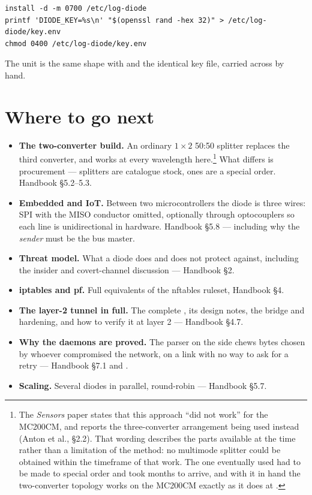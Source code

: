 \documentclass[11pt,a4paper]{article}
\begin{document}
\begin{lstlisting}[style=shell]
install -d -m 0700 /etc/log-diode
printf 'DIODE_KEY=%s\n' "$(openssl rand -hex 32)" > /etc/log-diode/key.env
chmod 0400 /etc/log-diode/key.env
\end{lstlisting}

The \dstside{} unit is the same shape with
and the identical key file, carried across by hand.

\section{Where to go next}

\begin{itemize}
\item \textbf{The two-converter build.} An ordinary $1\times2$ 50:50 splitter
      replaces the third converter, and works at every wavelength
      here.\footnote{The \emph{Sensors} paper states that this approach ``did
      not work'' for the MC200CM, and reports the three-converter arrangement
      being used instead (Anton et al., \S2.2). That wording describes the
      parts available at the time rather than a limitation of the method: no
       multimode splitter could be obtained within the timeframe of
      that work. The one eventually used had to be made to special order and
      took months to arrive, and with it in hand the two-converter topology
      works on the MC200CM exactly as it does at .} What differs is
      procurement ---  splitters are catalogue stock,  ones
      are a special order. Handbook \S5.2--5.3.
\item \textbf{Embedded and IoT.} Between two microcontrollers the diode is
      three wires: SPI with the MISO conductor omitted, optionally through
      optocouplers so each line is unidirectional in hardware. Handbook
      \S5.8 --- including why the \emph{sender} must be the bus master.
\item \textbf{Threat model.} What a diode does and does not protect against,
      including the insider and covert-channel discussion --- Handbook \S2.
\item \textbf{iptables and pf.} Full equivalents of the nftables ruleset,
      Handbook \S4.
\item \textbf{The layer-2 tunnel in full.} The complete ,
      its design notes, the bridge and  hardening, and how to
      verify it at layer 2 --- Handbook \S4.7.
\item \textbf{Why the daemons are proved.} The parser on the \dstside{} side
      chews bytes chosen by whoever compromised the \srcside{} network, on a
      link with no way to ask for a retry --- Handbook \S7.1 and
      .
\item \textbf{Scaling.} Several diodes in parallel, round-robin ---
      Handbook \S5.7.
\end{itemize}
\end{document}
